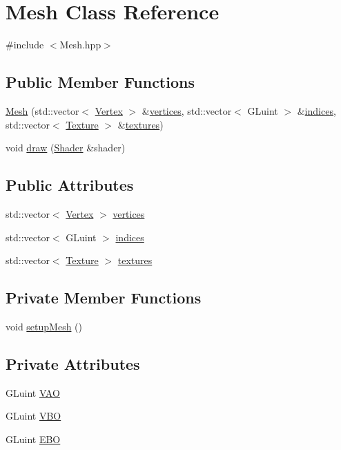 \hypertarget{classMesh}{}\section{Mesh Class Reference}
\label{classMesh}


{\ttfamily \#include $<$Mesh.\+hpp$>$}

\subsection*{Public Member Functions}
\begin{DoxyCompactItemize}
\item 
\hyperlink{classMesh_a3a7b7bb4a172a517e86e197b267f324d}{Mesh} (std\+::vector$<$ \hyperlink{structVertex}{Vertex} $>$ \&\hyperlink{classMesh_a6465a888c97232a39e12aad008c969c3}{vertices}, std\+::vector$<$ G\+Luint $>$ \&\hyperlink{classMesh_a5e55b84c6c967608bcf23ed7d68e4215}{indices}, std\+::vector$<$ \hyperlink{classTexture}{Texture} $>$ \&\hyperlink{classMesh_abf1e672703bf4f8e104f3b076faaf958}{textures})
\item 
void \hyperlink{classMesh_a431399cb5c25cc84cdf8c8e59a957585}{draw} (\hyperlink{classShader}{Shader} \&shader)
\end{DoxyCompactItemize}
\subsection*{Public Attributes}
\begin{DoxyCompactItemize}
\item 
std\+::vector$<$ \hyperlink{structVertex}{Vertex} $>$ \hyperlink{classMesh_a6465a888c97232a39e12aad008c969c3}{vertices}
\item 
std\+::vector$<$ G\+Luint $>$ \hyperlink{classMesh_a5e55b84c6c967608bcf23ed7d68e4215}{indices}
\item 
std\+::vector$<$ \hyperlink{classTexture}{Texture} $>$ \hyperlink{classMesh_abf1e672703bf4f8e104f3b076faaf958}{textures}
\end{DoxyCompactItemize}
\subsection*{Private Member Functions}
\begin{DoxyCompactItemize}
\item 
void \hyperlink{classMesh_aafa4e21067a9b0c4407daf5e3c9ea991}{setup\+Mesh} ()
\end{DoxyCompactItemize}
\subsection*{Private Attributes}
\begin{DoxyCompactItemize}
\item 
G\+Luint \hyperlink{classMesh_a09b989b9d4df8ae595d7e80e091a4a5b}{V\+AO}
\item 
G\+Luint \hyperlink{classMesh_a0d28b2c6fee628a13f43cae3f858569b}{V\+BO}
\item 
G\+Luint \hyperlink{classMesh_a894c6723c0172f4e38b2509582abfa6c}{E\+BO}
\end{DoxyCompactItemize}


